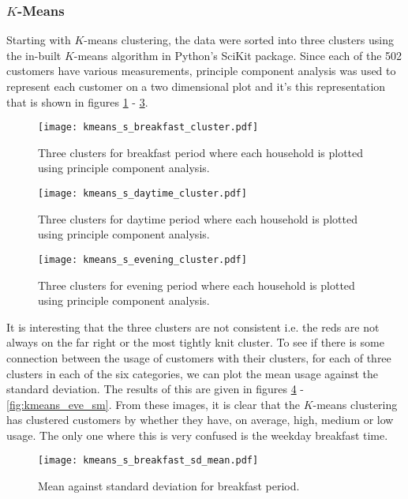 \documentclass[a4paper]{article}
\begin{document}
\subsubsection{$K$-Means} \label{subsubsec:kmeans_res} 

Starting with $K$-means clustering, the data were sorted into three clusters using the in-built $K$-means algorithm in Python's SciKit package. Since each of the 502 customers have various measurements, principle component analysis was used to represent each customer on a two dimensional plot and it's this representation that is shown in figures \ref{fig:kmeans_break} - \ref{fig:kmeans_eve}.

\begin{figure}
\centering
\texttt{[image: kmeans\_s\_breakfast\_cluster.pdf]}
\caption{\label{fig:kmeans_break}Three clusters for breakfast period where each household is plotted using principle component analysis.}
\end{figure}

\begin{figure}
\centering
\texttt{[image: kmeans\_s\_daytime\_cluster.pdf]}
\caption{\label{fig:kmeans_day}Three clusters for daytime period where each household is plotted using principle component analysis.}
\end{figure}

\begin{figure}
\centering
\texttt{[image: kmeans\_s\_evening\_cluster.pdf]}
\caption{\label{fig:kmeans_eve} Three clusters for evening period where each household is plotted using principle component analysis.}
\end{figure}

It is interesting that the three clusters are not consistent i.e. the reds are not always on the far right or the most tightly knit cluster. To see if there is some connection between the usage of customers with their clusters, for each of three clusters in each of the six categories, we can plot the mean usage against the standard deviation. The results of this are given in figures \ref{fig:kmeans_break_sm} - \ref{fig:kmeans_eve_sm}. From these images, it is clear that the $K$-means clustering has clustered customers by whether they have, on average, high, medium or low usage. The only one where this is very confused is the weekday breakfast time. 

\begin{figure}
\centering
\texttt{[image: kmeans\_s\_breakfast\_sd\_mean.pdf]}
\caption{\label{fig:kmeans_break_sm} Mean against standard deviation for breakfast period.}
\end{figure}
\end{document}
